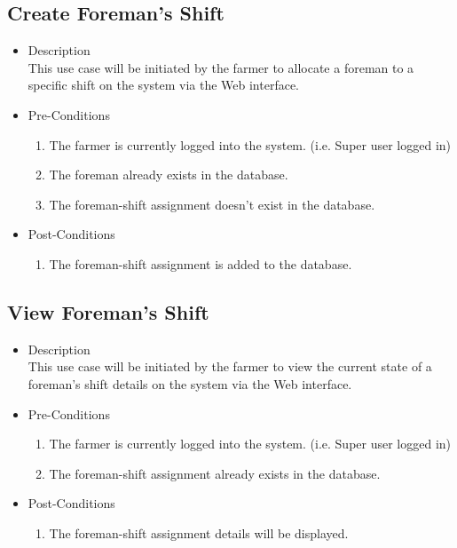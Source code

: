 \documentclass[11pt,fleqn]{book} %
\begin{document}
	\subsection{Create Foreman’s Shift}
	\begin{itemize}
		\item Description\\
		This use case will be initiated by the farmer to allocate a foreman to a specific shift on the system via the Web interface.
		\item Pre-Conditions
		\begin{enumerate}
			\item The farmer is currently logged into the system. (i.e. Super user logged in)
			\item The foreman already exists in the database. 
			\item The foreman-shift assignment doesn’t exist in the database.					
		\end{enumerate}
		\item Post-Conditions
		\begin{enumerate}
			\item The foreman-shift assignment is added to the database.
		\end{enumerate}
	\end{itemize}
	
	\subsection{View Foreman’s Shift}
	\begin{itemize}
		\item Description\\
		This use case will be initiated by the farmer to view the current state of a foreman’s shift details on the system via the Web interface.
		\item Pre-Conditions
		\begin{enumerate}
			\item The farmer is currently logged into the system. (i.e. Super user logged in)
			\item The foreman-shift assignment already exists in the database.		
		\end{enumerate}
		\item Post-Conditions
		\begin{enumerate}
			\item The foreman-shift assignment details will be displayed.
		\end{enumerate}
	\end{itemize}
	
\end{document}
